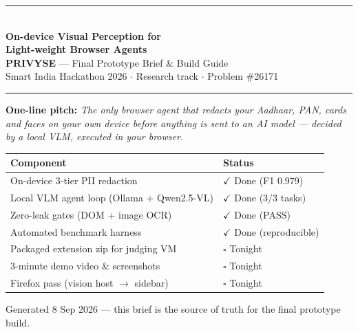 \documentclass[11pt,a4paper]{article}
\newcommand{\todo}{\textcolor{amber}{$\square$}}
\newcommand{\donecheck}{\textcolor{good}{$\checkmark$}}
\begin{document}
\begin{titlepage}
\centering
\vspace*{2cm}
{\color{primary}\rule{\linewidth}{1.8pt}}\\[10pt]
{\LARGE\bfseries\color{primary} On-device Visual Perception for\\[4pt] Light-weight Browser Agents}\\[12pt]
{\large \textbf{PRIVYSE} --- Final Prototype Brief \& Build Guide}\\[8pt]
{\normalsize Smart India Hackathon 2026 $\cdot$ Research track $\cdot$ Problem \#26171}\\[16pt]
{\color{primary}\rule{\linewidth}{0.8pt}}

\vspace{1.2cm}

\begin{minipage}{0.86\linewidth}
\textbf{One-line pitch:} \emph{The only browser agent that redacts your Aadhaar, PAN, cards and faces on your own device before anything is sent to an AI model --- decided by a local VLM, executed in your browser.}
\end{minipage}

\vspace{1.4cm}

\begin{tabular}{@{}ll@{}}
\toprule
\textbf{Component} & \textbf{Status} \\
\midrule
On-device 3-tier PII redaction & \donecheck{} Done (F1 0.979) \\
Local VLM agent loop (Ollama + Qwen2.5-VL) & \donecheck{} Done (3/3 tasks) \\
Zero-leak gates (DOM + image OCR) & \donecheck{} Done (PASS) \\
Automated benchmark harness & \donecheck{} Done (reproducible) \\
Packaged extension zip for judging VM & \todo{} Tonight \\
3-minute demo video \& screenshots & \todo{} Tonight \\
Firefox pass (vision host $\rightarrow$ sidebar) & \todo{} Tonight \\
\bottomrule
\end{tabular}

\vspace{1.5cm}
{\footnotesize\color{black!55} Generated 8 Sep 2026 --- this brief is the source of truth for the final prototype build.}
\end{titlepage}
\end{document}
